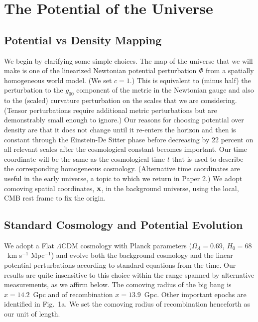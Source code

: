 \documentclass[useAMS,usenatbib,a4paper]{mn2e}
\begin{document}

\section{The Potential of the Universe}

\subsection{Potential vs Density Mapping}

We begin by clarifying some simple choices. The map of the universe
that we will make is one of the linearized Newtonian potential
perturbation $\Phi$ from a spatially homogeneous world model. (We set
$c=1$.) This is equivalent to (minus half) the perturbation to the
$g_{00}$ component of the metric in the Newtonian gauge and also to
the (scaled) curvature perturbation on the scales that we are
considering. (Tensor perturbations require additional metric
perturbations but are demonstrably small enough to ignore.) Our
reasons for choosing potential over density are that it does not
change until it re-enters the horizon and then is constant through the
Einstein-De Sitter phase before decreasing by 22 percent on all
relevant scales after the cosmological constant becomes important. Our
time coordinate will be the same as the cosmological time $t$ that is
used to describe the corresponding homogeneous cosmology. (Alternative
time coordinates are useful in the early universe, a topic to which we
return in Paper 2.) We adopt comoving spatial coordinates, $\bf x$, in
the background universe, using the local, CMB rest frame to fix the
origin.

\subsection{Standard Cosmology and Potential Evolution}

We adopt a Flat $\Lambda$CDM cosmology with Planck parameters
($\Omega_\Lambda=0.69$, $H_0=68$~km s$^{-1}$ Mpc$^{-1}$) and evolve
both the background cosmology and the linear potential perturbations
according to standard equations from the time. Our results are quite
insensitive to this choice within the range spanned by alternative
measurements, as we affirm below. The comoving radius of the big bang
is $x=14.2$~Gpc and of recombination $x=13.9$~Gpc. Other important
epochs are identified in Fig.~1a. We set the comoving radius of
recombination henceforth as our unit of length.
\end{document}
